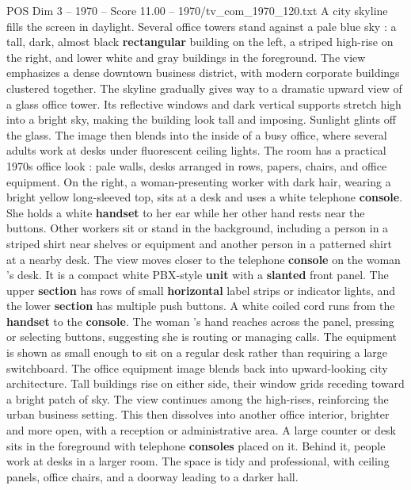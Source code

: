 \begin{textsample}{POS Dim 3 – 1970 – Score 11.00 – 1970/tv\_com\_1970\_120.txt}  \label{ex:f3_pos_031}
A city skyline fills the screen in daylight.
Several office towers stand against a pale blue sky : a tall, dark, almost black \textbf{rectangular} building on the left, a striped high-rise on the right, and lower white and gray buildings in the foreground.
The view emphasizes a dense downtown business district, with modern corporate buildings clustered together.
The skyline gradually gives way to a dramatic upward view of a glass office tower.
Its reflective windows and dark vertical supports stretch high into a bright sky, making the building look tall and imposing.
Sunlight glints off the glass.
The image then blends into the inside of a busy office, where several adults work at desks under fluorescent ceiling lights.
The room has a practical 1970s office look : pale walls, desks arranged in rows, papers, chairs, and office equipment.
On the right, a woman-presenting worker with dark hair, wearing a bright yellow long-sleeved top, sits at a desk and uses a white telephone \textbf{console}.
She holds a white \textbf{handset} to her ear while her other hand rests near the buttons.
Other workers sit or stand in the background, including a person in a striped shirt near shelves or equipment and another person in a patterned shirt at a nearby desk.
The view moves closer to the telephone \textbf{console} on the woman ’s desk.
It is a compact white PBX-style \textbf{unit} with a \textbf{slanted} front panel.
The upper \textbf{section} has rows of small \textbf{horizontal} label strips or indicator lights, and the lower \textbf{section} has multiple push buttons.
A white coiled cord runs from the \textbf{handset} to the \textbf{console}.
The woman ’s hand reaches across the panel, pressing or selecting buttons, suggesting she is routing or managing calls.
The equipment is shown as small enough to sit on a regular desk rather than requiring a large switchboard.
The office equipment image blends back into upward-looking city architecture.
Tall buildings rise on either side, their window grids receding toward a bright patch of sky.
The view continues among the high-rises, reinforcing the urban business setting.
This then dissolves into another office interior, brighter and more open, with a reception or administrative area.
A large counter or desk sits in the foreground with telephone \textbf{consoles} placed on it.
Behind it, people work at desks in a larger room.
The space is tidy and professional, with ceiling panels, office chairs, and a doorway leading to a darker hall.

\end{textsample}
